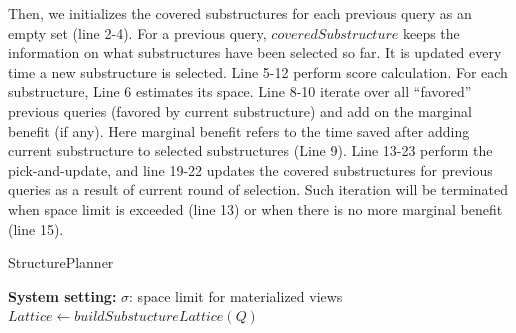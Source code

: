 Then, we initializes the covered substructures for each previous query as an empty set (line 2-4). For a previous query, $coveredSubstructure$ keeps the information on what substructures have been selected so far. %
It is updated every time a new substructure is selected. Line 5-12 perform score calculation. For each substructure, Line 6 estimates its space. Line 8-10 iterate over all ``favored'' previous queries (favored by current substructure) and add on the marginal benefit (if any). Here marginal benefit refers to the time saved after adding current substructure to selected substructures (Line 9). Line 13-23 perform the pick-and-update, and line 19-22 updates the covered substructures for previous queries as a result of current round of selection. Such iteration will be terminated when space limit is exceeded (line 13) or when there is no more marginal benefit (line 15).

\begin{algorithm}%
\label{alg:5}
\caption{StructurePlanner}
\LinesNumbered
\textbf{System setting:} $\sigma$: space limit for materialized views\\
$Lattice \leftarrow buildSubstuctureLattice(Q)$\;
\end{algorithm}

